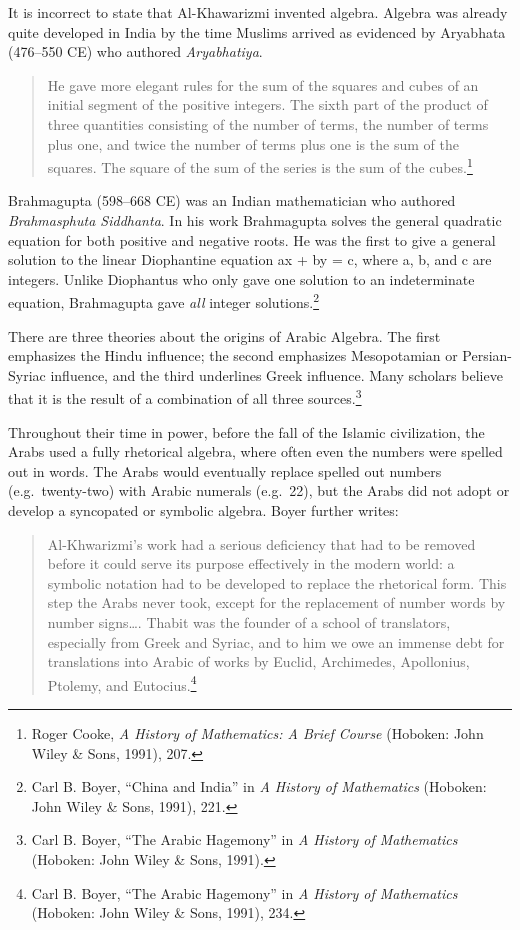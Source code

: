 It is incorrect to state that Al-Khawarizmi invented algebra. Algebra was already quite developed in India by the time Muslims arrived as evidenced by Aryabhata (476–550 CE) who authored \textit{Aryabhatiya}. 
\begin{quote}
He gave more elegant rules for the sum of the squares and cubes of an initial segment of the positive integers. The sixth part of the product of three quantities consisting of the number of terms, the number of terms plus one, and twice the number of terms plus one is the sum of the squares. The square of the sum of the series is the sum of the cubes.\footnote{Roger Cooke, \textit{A History of Mathematics: A Brief Course} (Hoboken: John Wiley \& Sons, 1991), 207.}
\end{quote}
Brahmagupta (598--668 CE) was an Indian mathematician who authored \textit{Brahmasphuta Siddhanta}. In his work Brahmagupta solves the general quadratic equation for both positive and negative roots. He was the first to give a general solution to the linear Diophantine equation ax + by = c, where a, b, and c are integers. Unlike Diophantus who only gave one solution to an indeterminate equation, Brahmagupta gave \textit{all} integer solutions.\footnote{Carl B. Boyer, “China 	and India” in \textit{A History of Mathematics}  (Hoboken: John Wiley \& Sons, 1991), 221.}

There are three theories about the origins of Arabic Algebra. The first emphasizes the Hindu influence; the second emphasizes Mesopotamian or Persian-Syriac influence, and the third underlines Greek influence. Many scholars believe that it is the result of a combination of all three sources.\footnote{Carl B. Boyer, “The 	Arabic Hagemony” in \textit{A History of Mathematics} (Hoboken: John Wiley \& Sons, 1991).} 

Throughout their time in power, before the fall of the Islamic civilization, the Arabs used a fully rhetorical algebra, where often even the numbers were spelled out in words. The Arabs would eventually replace spelled out numbers (e.g.\ twenty-two) with Arabic numerals (e.g.\ 22), but the Arabs did not adopt or develop a syncopated or symbolic algebra. Boyer further writes:
\begin{quote}
Al-Khwarizmi's work had a serious deficiency that had to be removed before it could serve its purpose effectively in the modern world: a symbolic notation had to be developed to replace the rhetorical form. This step the Arabs never took, except for the replacement of number words by number signs…. Thabit was the founder of a school of translators, especially from Greek and Syriac, and to him we owe an immense debt for translations into Arabic of works by Euclid, Archimedes, Apollonius, Ptolemy, and Eutocius.\footnote{Carl B. Boyer, “The Arabic Hagemony” in \textit{A History of Mathematics} (Hoboken: John Wiley \& Sons, 1991), 234.}
\end{quote}
